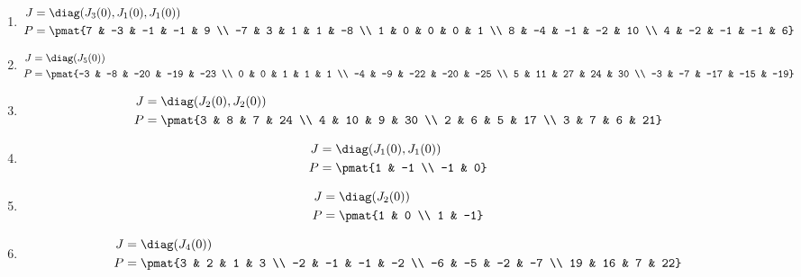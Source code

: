 \begin{enumerate}
\item

\begin{align*}
J &= \diag(J_{3}(0), J_{1}(0), J_{1}(0))\\
P &= \pmat{7 & -3 & -1 & -1 & 9 \\ -7 & 3 & 1 & 1 & -8 \\ 1 & 0 & 0 & 0 & 1 \\ 8 & -4 & -1 & -2 & 10 \\ 4 & -2 & -1 & -1 & 6}
\end{align*}

\item

\begin{align*}
J &= \diag(J_{5}(0))\\
P &= \pmat{-3 & -8 & -20 & -19 & -23 \\ 0 & 0 & 1 & 1 & 1 \\ -4 & -9 & -22 & -20 & -25 \\ 5 & 11 & 27 & 24 & 30 \\ -3 & -7 & -17 & -15 & -19}
\end{align*}

\item

\begin{align*}
J &= \diag(J_{2}(0), J_{2}(0))\\
P &= \pmat{3 & 8 & 7 & 24 \\ 4 & 10 & 9 & 30 \\ 2 & 6 & 5 & 17 \\ 3 & 7 & 6 & 21}
\end{align*}

\item

\begin{align*}
J &= \diag(J_{1}(0), J_{1}(0))\\
P &= \pmat{1 & -1 \\ -1 & 0}
\end{align*}

\item

\begin{align*}
J &= \diag(J_{2}(0))\\
P &= \pmat{1 & 0 \\ 1 & -1}
\end{align*}

\item

\begin{align*}
J &= \diag(J_{4}(0))\\
P &= \pmat{3 & 2 & 1 & 3 \\ -2 & -1 & -1 & -2 \\ -6 & -5 & -2 & -7 \\ 19 & 16 & 7 & 22}
\end{align*}


\end{enumerate}
